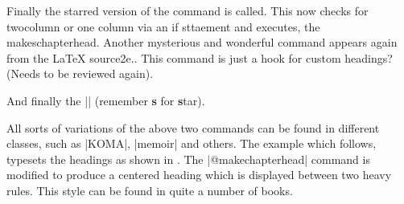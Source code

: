 \begin{teX}
\def\@makechapterhead
\def\@makeschapterhead
\end{teX}

\begin{teX}
\def\@makechapterhead#1{%
  \vspace*{50\p@}%
  {\parindent \z@ \raggedright \normalfont
    \ifnum \c@secnumdepth >\m@ne
      \if@mainmatter
        \huge\bfseries \@chapapp\space \thechapter
        \par\nobreak
        \vskip 20\p@
      \fi
    \fi
    \interlinepenalty\@M
    \Huge \bfseries #1\par\nobreak
    \vskip 40\p@
  }}
\end{teX}


Finally the starred version of the command is called. This now checks for twocolumn or one column via an if sttaement and executes, the makeschapterhead. Another mysterious and wonderful command appears again from the LaTeX source2e.\cmd{\@afterheading}. This command 
is just a hook for custom headings? (Needs to be reviewed again).


\begin{teX}
\def\@schapter#1{\if@twocolumn
                   \@topnewpage[\@makeschapterhead{#1}]%
                 \else
                   \@makeschapterhead{#1}%
                   \@afterheading
                 \fi}
\end{teX}

And finally the |\@makeschapterhead| (remember \textbf{s} for \textbf{s}tar).

\begin{teX}
\def\@makeschapterhead#1{%
  \vspace*{50\p@}%
  {\parindent \z@ \raggedright
    \normalfont
    \interlinepenalty\@M
    \Huge \bfseries  #1\par\nobreak
    \vskip 40\p@
  }}
\end{teX}

All sorts of variations of the above two commands can be found in different classes, such as |KOMA|, |memoir| and others. The example which follows, typesets the headings as shown in . The |@makechapterhead| command is modified to produce a centered heading which is displayed between two heavy rules. This style can be found in quite a number of books.

